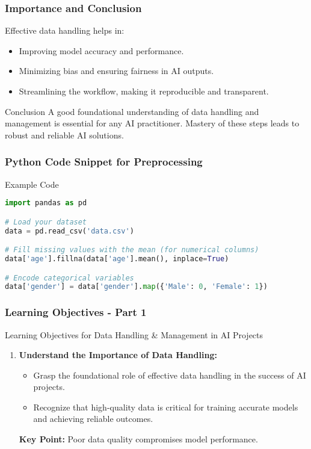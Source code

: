\documentclass[aspectratio=169]{beamer}
\begin{document}
\begin{frame}[fragile]
    \frametitle{Importance and Conclusion}
    Effective data handling helps in:
    \begin{itemize}
        \item Improving model accuracy and performance.
        \item Minimizing bias and ensuring fairness in AI outputs.
        \item Streamlining the workflow, making it reproducible and transparent.
    \end{itemize}

    \begin{block}{Conclusion}
        A good foundational understanding of data handling and management is essential for any AI practitioner. Mastery of these steps leads to robust and reliable AI solutions.
    \end{block}
\end{frame}

\begin{frame}[fragile]
    \frametitle{Python Code Snippet for Preprocessing}
    \begin{block}{Example Code}
        \begin{lstlisting}[language=Python]
import pandas as pd

# Load your dataset
data = pd.read_csv('data.csv')

# Fill missing values with the mean (for numerical columns)
data['age'].fillna(data['age'].mean(), inplace=True)

# Encode categorical variables
data['gender'] = data['gender'].map({'Male': 0, 'Female': 1})
        \end{lstlisting}
    \end{block}
\end{frame}

\begin{frame}[fragile]
    \frametitle{Learning Objectives - Part 1}
    \begin{block}{Learning Objectives for Data Handling \& Management in AI Projects}
        \begin{enumerate}
            \item \textbf{Understand the Importance of Data Handling:}
            \begin{itemize}
                \item Grasp the foundational role of effective data handling in the success of AI projects.
                \item Recognize that high-quality data is critical for training accurate models and achieving reliable outcomes.
            \end{itemize}
            \textbf{Key Point:} Poor data quality compromises model performance.
        \end{enumerate}
    \end{block}
\end{frame}
\end{document}
